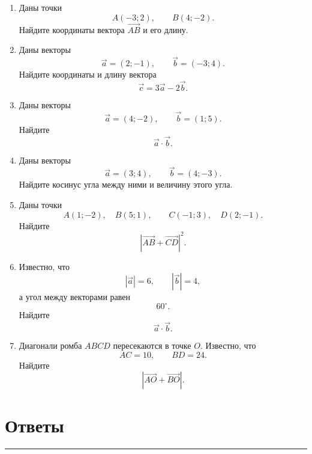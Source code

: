 \documentclass[a4paper,12pt]{article}
\newcommand{\vect}[1]{\overrightarrow{#1}}
\newcommand{\vct}[1]{\vec{#1}}
\newcommand{\modv}[1]{\left|#1\right|}
\newcommand{\sectionline}{%
    \vspace{0.1em}
    {\color{accent}\rule{\linewidth}{0.6pt}}
    \vspace{0.3em}
}
\newcommand{\topic}[1]{%
    \Needspace{7\baselineskip}%
    \section*{\color{darkaccent}#1}
    \sectionline
}
\begin{document}
\begin{enumerate}

    \item Даны точки
    \[
    A(-3;2),
    \qquad
    B(4;-2).
    \]
    Найдите координаты вектора \(\vect{AB}\) и его длину.

    \vspace{8mm}

    \item Даны векторы
    \[
    \vct a=(2;-1),
    \qquad
    \vct b=(-3;4).
    \]
    Найдите координаты и длину вектора
    \[
    \vct c=3\vct a-2\vct b.
    \]

    \vspace{8mm}

    \item Даны векторы
    \[
    \vct a=(4;-2),
    \qquad
    \vct b=(1;5).
    \]
    Найдите
    \[
    \vct a\cdot\vct b.
    \]

    \vspace{8mm}

    \item Даны векторы
    \[
    \vct a=(3;4),
    \qquad
    \vct b=(4;-3).
    \]
    Найдите косинус угла между ними и величину этого угла.

    \vspace{8mm}

    \item Даны точки
    \[
    A(1;-2),\quad B(5;1),
    \qquad
    C(-1;3),\quad D(2;-1).
    \]
    Найдите
    \[
    \modv{\vect{AB}+\vect{CD}}^2.
    \]

    \vspace{8mm}

    \item Известно, что
    \[
    \modv{\vct a}=6,
    \qquad
    \modv{\vct b}=4,
    \]
    а угол между векторами равен
    \[
    60^\circ.
    \]
    Найдите
    \[
    \vct a\cdot\vct b.
    \]

    \vspace{8mm}

    \item Диагонали ромба \(ABCD\) пересекаются в точке \(O\). Известно, что
    \[
    AC=10,
    \qquad
    BD=24.
    \]
    Найдите
    \[
    \modv{\vect{AO}+\vect{BO}}.
    \]

\end{enumerate}

\clearpage

\topic{Ответы}

\renewcommand{\arraystretch}{1.45}
\end{document}

